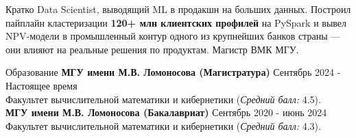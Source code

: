 \documentclass{resume} %
\begin{document}
	\begin{rSection}{Кратко}
		Data Scientist, выводящий ML в продакшн на больших данных. Построил пайплайн кластеризации
		\textbf{120+ млн клиентских профилей} на PySpark и вывел NPV-модели в промышленный контур одного
		из крупнейших банков страны --- они влияют на реальные решения по продуктам. Магистр ВМК МГУ.
	\end{rSection}

	\begin{rSection}{Образование}
		\textbf{МГУ имени М.В. Ломоносова (Магистратура)} \hfill {Сентябрь 2024 - Настоящее время}\\
		Факультет вычислительной математики и кибернетики (\textit{Средний балл:} 4.5).\\
		\textbf{МГУ имени М.В. Ломоносова (Бакалавриат)} \hfill {Сентябрь 2020 - июнь 2024}\\
		Факультет вычислительной математики и кибернетики (\textit{Средний балл:} 4.3).
	\end{rSection}
\end{document}
